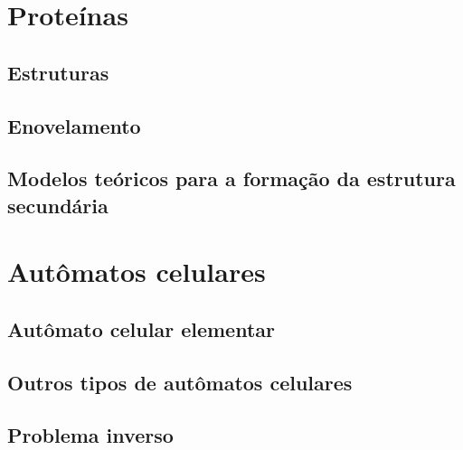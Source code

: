 

\section{Proteínas}

\subsection{Estruturas}

\subsection{Enovelamento}

\subsection{Modelos teóricos para a formação da estrutura secundária}


\section{Autômatos celulares}

\subsection{Autômato celular elementar}

\subsection{Outros tipos de autômatos celulares}

\subsection{Problema inverso}
